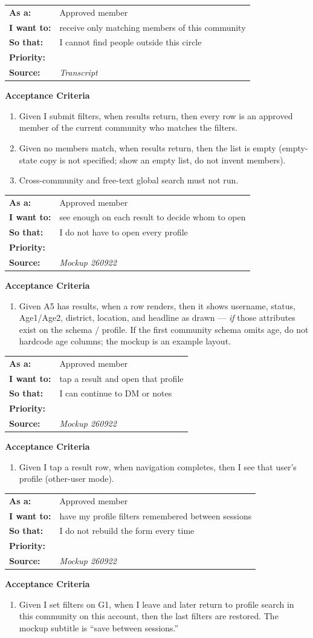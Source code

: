 \documentclass[11pt,a4paper]{article}
\makeatletter
\newcommand{\priPzero}{\colorbox{p0}{\makebox[4.6em]{\textcolor{white}{\scriptsize\bfseries P0 V1}}}}
\newcommand{\srcTx}{\textit{Transcript}}
\newcommand{\srcMock}{\textit{Mockup 260922}}
\newenvironment{story}[1]{%
  \Needspace{10\baselineskip}%
  \vspace{0.7em}%
  \noindent
  \colorbox{navy}{\makebox[\dimexpr\textwidth-2\fboxsep\relax][l]{\textcolor{white}{\bfseries\ #1}}}%
  \par\vspace{0.35em}%
}{\par\vspace{0.55em}}
\newcommand{\storymeta}[5]{%
  \noindent
  \begin{tabularx}{\textwidth}{@{}>{\bfseries}l X@{}}
    As a: & #1 \\
    I want to: & #2 \\
    So that: & #3 \\
    Priority: & #4 \\
    Source: & #5 \\
  \end{tabularx}
  \par\vspace{0.3em}
}
\newcommand{\achead}{\noindent\textbf{Acceptance Criteria}\par}
\makeatother
\begin{document}
\begin{story}{SEARCH-003 --- Results are community-scoped}
\storymeta{Approved member}{receive only matching members of this community}{I cannot find people outside this circle}{\priPzero}{\srcTx}
\achead
\begin{enumerate}
  \item Given I submit filters, when results return, then every row is an approved member of the current community who matches the filters.
  \item Given no members match, when results return, then the list is empty (empty-state copy is not specified; show an empty list, do not invent members).
  \item Cross-community and free-text global search must not run.
\end{enumerate}
\end{story}

\begin{story}{SEARCH-004 --- Result row content}
\storymeta{Approved member}{see enough on each result to decide whom to open}{I do not have to open every profile}{\priPzero}{\srcMock}
\achead
\begin{enumerate}
  \item Given A5 has results, when a row renders, then it shows username, status, Age1/Age2, district, location, and headline as drawn --- \emph{if} those attributes exist on the schema / profile. If the first community schema omits age, do not hardcode age columns; the mockup is an example layout.
\end{enumerate}
\end{story}

\begin{story}{SEARCH-005 --- Open a profile from a result}
\storymeta{Approved member}{tap a result and open that profile}{I can continue to DM or notes}{\priPzero}{\srcMock}
\achead
\begin{enumerate}
  \item Given I tap a result row, when navigation completes, then I see that user's profile (other-user mode).
\end{enumerate}
\end{story}

\begin{story}{SEARCH-006 --- Persist filters between sessions}
\storymeta{Approved member}{have my profile filters remembered between sessions}{I do not rebuild the form every time}{\priPzero}{\srcMock}
\achead
\begin{enumerate}
  \item Given I set filters on G1, when I leave and later return to profile search in this community on this account, then the last filters are restored. The mockup subtitle is ``save between sessions.''
\end{enumerate}
\end{story}
\end{document}
